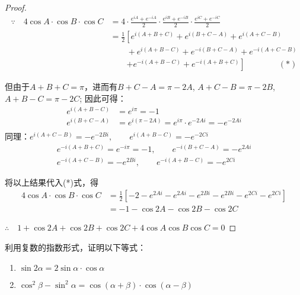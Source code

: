 \begin{proof}
\[\begin{split}
 \because\quad    4\cos A\cdot \cos B\cdot \cos C &=4\cdot\frac{e^{iA}+e^{-iA}}{2}\cdot\frac{e^{iB}+e^{-iB}}{2}\cdot\frac{e^{iC}+e^{-iC}}{2}\\
 &=\frac{1}{2}\left[e^{i(A+B+C)}+e^{i(B+C-A)}+e^{i(A+C-B)}\right.\\
 &\qquad   +e^{i(A+B-C)}+e^{-i(B+C-A)}+e^{-i(A+C-B)}\\
&\qquad  \left.+e^{-i(A+B-C)}+e^{-i(A+B+C)}\right]\qquad  \qquad  (*)
\end{split}\]

但由于$A+B+C=\pi$，进而有$B+C-A=\pi-2A$, 
$A+C-B=\pi-2B$, $A+B-C=\pi-2C$; 因此可得：
\[\begin{split}
    e^{i(A+B-C)}&=e^{i\pi}=-1\\
    e^{i(B+C-A)}&=e^{i(\pi-2A)}=e^{i\pi}\cdot e^{-2Ai}=-e^{-2Ai}\\
\end{split}\]
同理：$e^{i(A+C-B)}=-e^{-2Bi},\qquad e^{i(A+B-C)}=-e^{-2Ci}$
\[\begin{split}
    e^{-i(A+B+C)}=e^{-i\pi}=-1,\qquad 
    e^{-i(B+C-A)}=-e^{2Ai}\\
    e^{-i(A+C-B)}=-e^{2Bi},\qquad 
    e^{-i(A+B-C)}=-e^{2Ci}
\end{split}\]

将以上结果代入(*)式，得
\[\begin{split}
    4\cos A\cdot \cos B\cdot \cos C &=\frac{1}{2}\left[-2-e^{2Ai}-e^{2Ai}-e^{2Bi}-e^{2Bi}-e^{2Ci}-e^{2Ci}\right]\\
    &=-1-\cos2A-\cos2B-\cos2C
\end{split}\]

$\therefore\quad 1+\cos 2A+\cos 2B+\cos 2C+4\cos A  \cos B  \cos C=0$
\end{proof}

\begin{ex}
利用复数的指数形式，证明以下等式：
\begin{enumerate}
    \item $\sin2\alpha=2\sin\alpha\cdot \cos\alpha$
    \item $\cos^2\beta-\sin^2\alpha=\cos(\alpha+\beta)\cdot \cos(\alpha-\beta)$
\end{enumerate}
\end{ex}

